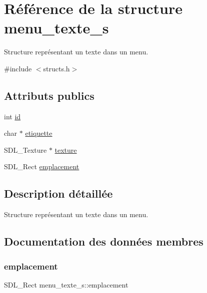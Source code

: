 \hypertarget{structmenu__texte__s}{}\section{Référence de la structure menu\+\_\+texte\+\_\+s}
\label{structmenu__texte__s}


Structure représentant un texte dans un menu.  




{\ttfamily \#include $<$structs.\+h$>$}

\subsection*{Attributs publics}
\begin{DoxyCompactItemize}
\item 
int \hyperlink{structmenu__texte__s_a7826dcecd14251361929dc821a137e1f}{id}
\item 
char $\ast$ \hyperlink{structmenu__texte__s_a84789ab6f657a0e69c9f5931d25bbcab}{etiquette}
\item 
S\+D\+L\+\_\+\+Texture $\ast$ \hyperlink{structmenu__texte__s_a1177e58383e5fd4a43def0c959d2244d}{texture}
\item 
S\+D\+L\+\_\+\+Rect \hyperlink{structmenu__texte__s_af1d1fe1527a44562c5e5f493182b0d52}{emplacement}
\end{DoxyCompactItemize}


\subsection{Description détaillée}
Structure représentant un texte dans un menu. 

\subsection{Documentation des données membres}
\mbox{\label{structmenu__texte__s_af1d1fe1527a44562c5e5f493182b0d52}} 
\subsubsection{\texorpdfstring{emplacement}{emplacement}}
{\footnotesize\ttfamily S\+D\+L\+\_\+\+Rect menu\+\_\+texte\+\_\+s\+::emplacement}

